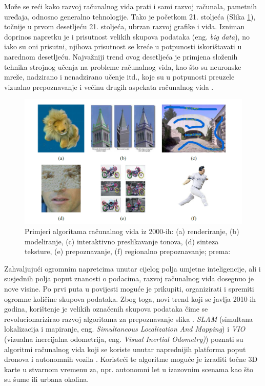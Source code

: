 \documentclass[]{foi} %
\begin{document}
Može se reći kako razvoj računalnog vida prati i sami razvoj računala, pametnih uređaja, odnosno generalno tehnologije. Tako je početkom 21. stoljeća (Slika \ref{fig:2000ih}), točnije u prvom desetljeću 21. stoljeća, ubrzan razvoj grafike i vida. Izniman doprinos napretku je i prisutnost velikih skupova podataka (eng. \textit{big data}), no iako su oni prisutni, njihova prisutnost se kreće u potpunosti iskorištavati u narednom desetljeću. Najvažniji trend ovog desetljeća je primjena složenih tehnika strojnog učenja na probleme računalnog vida, kao što su neuronske mreže, nadzirano i nenadzirano učenje itd., koje su u potpunosti preuzele vizualno prepoznavanje i većinu drugih aspekata računalnog vida \cite[str. 19]{szeliskicvaa}.

\begin{figure}[!ht]
    \centering
    \includegraphics[width=1\textwidth]{slike/2000.png}
    \caption{Primjeri algoritama računalnog vida iz 2000-ih: (a) renderiranje, (b) modeliranje, (c) interaktivno preslikavanje tonova, (d) sinteza teksture, (e) prepoznavanje, (f) regionalno prepoznavanje; prema: \cite{szeliskicvaa}}
    \label{fig:2000ih}
\end{figure}

Zahvaljujući ogromnim napretcima unutar cijelog polja umjetne inteligencije, ali i susjednih polja poput znanosti o podacima, razvoj računalnog vida dosegnuo je nove visine. Po prvi puta u povijesti moguće je prikupiti, organizirati i spremiti ogromne količine skupova podataka. Zbog toga, novi trend koji se javlja 2010-ih godina, korištenje je velikih označenih skupova podataka čime se revolucionarizirao razvoj algoritama za prepoznavanje slika \cite[str. 20]{szeliskicvaa}. \textit{SLAM} (simultana lokalizacija i mapiranje, eng. \textit{Simultaneous Localization And Mapping}) i \textit{VIO} (vizualna inercijalna odometrija, eng. \textit{Visual Inertial Odometry)}) \cite[str. 20, 21, 22]{szeliskicvaa} poznati su algoritmi računalnog vida koji se koriste unutar naprednijih platforma poput dronova i autonomnih vozila \cite[str. 22]{szeliskicvaa}. Koristeći te algoritme moguće je izraditi točne 3D karte u stvarnom vremenu za, npr. autonomni let u izazovnim scenama kao što su šume ili urbana okolina. 
\end{document}

